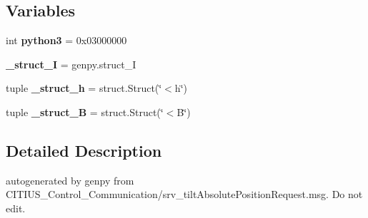 \subsection*{\-Variables}
\begin{DoxyCompactItemize}
\item 
\hypertarget{namespace_c_i_t_i_u_s___control___communication_1_1srv_1_1__srv__tilt_absolute_position_aba69609d7d74f19f309a538c6df0cde1}{int {\bfseries python3} = 0x03000000}\label{namespace_c_i_t_i_u_s___control___communication_1_1srv_1_1__srv__tilt_absolute_position_aba69609d7d74f19f309a538c6df0cde1}

\item 
\hypertarget{namespace_c_i_t_i_u_s___control___communication_1_1srv_1_1__srv__tilt_absolute_position_a1531452e512d31ff8eaaadfdcdea3c3d}{{\bfseries \-\_\-struct\-\_\-\-I} = genpy.\-struct\-\_\-\-I}\label{namespace_c_i_t_i_u_s___control___communication_1_1srv_1_1__srv__tilt_absolute_position_a1531452e512d31ff8eaaadfdcdea3c3d}

\item 
\hypertarget{namespace_c_i_t_i_u_s___control___communication_1_1srv_1_1__srv__tilt_absolute_position_a576224097ea615f32854118b9cc2f607}{tuple {\bfseries \-\_\-struct\-\_\-h} = struct.\-Struct(\char`\"{}$<$h\char`\"{})}\label{namespace_c_i_t_i_u_s___control___communication_1_1srv_1_1__srv__tilt_absolute_position_a576224097ea615f32854118b9cc2f607}

\item 
\hypertarget{namespace_c_i_t_i_u_s___control___communication_1_1srv_1_1__srv__tilt_absolute_position_adcde85b9c921a60f1027e65200e51653}{tuple {\bfseries \-\_\-struct\-\_\-\-B} = struct.\-Struct(\char`\"{}$<$\-B\char`\"{})}\label{namespace_c_i_t_i_u_s___control___communication_1_1srv_1_1__srv__tilt_absolute_position_adcde85b9c921a60f1027e65200e51653}

\end{DoxyCompactItemize}


\subsection{\-Detailed \-Description}
\begin{DoxyVerb}autogenerated by genpy from CITIUS_Control_Communication/srv_tiltAbsolutePositionRequest.msg. Do not edit.\end{DoxyVerb}
 